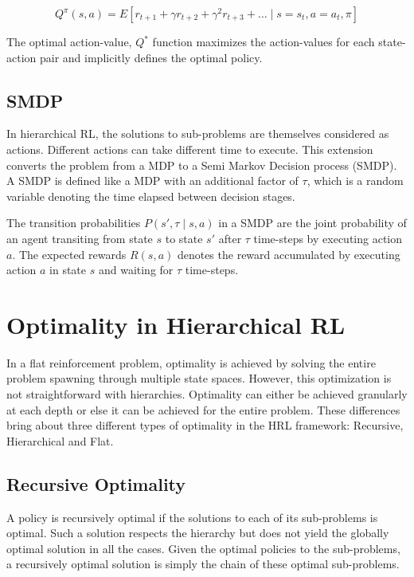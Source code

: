 \begin{equation}
    Q^\pi (s, a)=E[r_{t+1}+\gamma r_{t+2}+ \gamma^2 r_{t+3} + \dots \mid s=s_t, a=a_t, \pi]
\end{equation}

The optimal action-value, \(Q^*\) function maximizes the action-values for each state-action pair and
implicitly defines the optimal policy.

\subsection*{SMDP}

In hierarchical RL, the solutions to sub-problems are themselves considered as actions.
Different actions can take different time to execute.
This extension converts the problem from a MDP to a Semi Markov Decision process (SMDP).
A SMDP is defined like a MDP with an additional factor of \(\tau\), which is
a random variable denoting the time elapsed between decision stages.

The transition probabilities \(P(s', \tau \mid s,a)\) in a SMDP are
the joint probability of an agent transiting from state \(s\) to state \(s'\)  after \(\tau\)
time-steps by executing action \(a\).
The expected rewards \(R(s,a)\) denotes the reward accumulated by executing action
\(a\) in state \(s\) and waiting for \(\tau\) time-steps.

\section*{Optimality in Hierarchical RL}

In a flat reinforcement problem, optimality is achieved by solving the entire problem spawning through multiple
state spaces. However, this optimization is not straightforward with hierarchies.
Optimality can either be achieved granularly at each depth or else it can be achieved for the entire problem.
These differences bring about three different types of optimality in the HRL framework: Recursive, Hierarchical and Flat.

\subsection*{Recursive Optimality}
A policy is recursively optimal if the solutions to each of its sub-problems is optimal.
Such a solution respects the hierarchy but does not yield the globally optimal solution in all the cases.
Given the optimal policies to the sub-problems, a recursively optimal solution is simply the chain of these optimal sub-problems.

